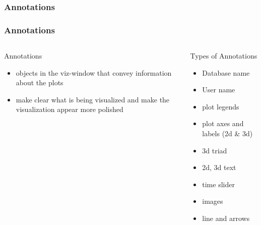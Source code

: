 \subsubsection{Annotations}
\begin{frame}
\frametitle{Annotations}
\begin{columns}
\begin{column}{5cm}
\begin{block}{Annotations}
\begin{itemize}
	\item objects in the viz-window
		that convey information about the plots
	\item make clear what is being visualized and make
		the visualization appear more polished
\end{itemize}
\end{block}
\end{column}
\begin{column}{5cm}
\begin{block}{Types of Annotations}
\begin{itemize}
        \item Database name
        \item User name
	\item plot legends
	\item plot axes and labels (2d \& 3d)
	\item 3d triad
	\item 2d, 3d text
	\item time slider
	\item images
	\item line and arrows
\end{itemize}
\end{block}
\end{column}
\end{columns}
\end{frame}


